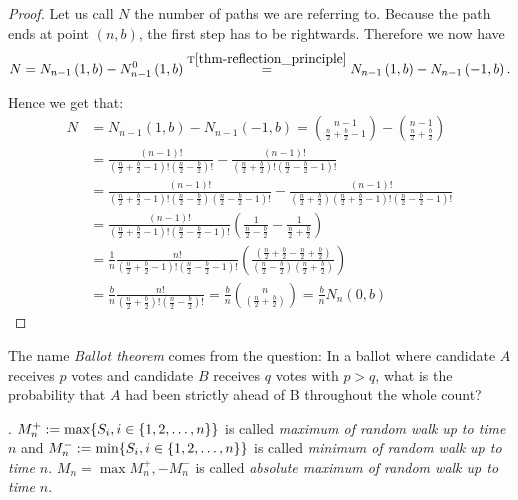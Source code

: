 \begin{proof}
 Let us call $N$ the number of paths we are referring to.
 Because the path ends at point $ \left( n,b \right) $, the first step has to be rightwards. Therefore we now have
 \[
    N=N_{n-1} \left( 1,b \right) -N_{n-1}^0 \left( 1,b \right) \overset{\text{T}\ref{thm-reflection_principle}}{=}N_{n-1} \left( 1,b \right) -N_{n-1} \left( -1,b \right).
\]


 Hence we get that:
 \[
 \begin{split}
 N & = N_{n-1} \left( 1,b \right) -N_{n-1} \left( -1,b \right)
 =\binom{n-1}{\frac{n}{2}+\frac{b}{2}-1}-\binom{n-1}{\frac{n}{2}+\frac{b}{2}}\\
 & =\frac{ \left( n-1 \right) !}{ \left( \frac{n}{2}+\frac{b}{2}-1 \right) ! \left( \frac{n}{2}-\frac{b}{2} \right) !}-\frac{ \left( n-1 \right) !}{ \left( \frac{n}{2}+\frac{b}{2} \right) ! \left( \frac{n}{2}-\frac{b}{2}-1 \right) !}\\
 & =\frac{ \left( n-1 \right) !}{ \left( \frac{n}{2}+\frac{b}{2}-1 \right) ! \left( \frac{n}{2}-\frac{b}{2} \right) \left( \frac{n}{2}-\frac{b}{2}-1 \right) !}-\frac{ \left( n-1 \right) !}{ \left( \frac{n}{2}+\frac{b}{2} \right) \left( \frac{n}{2}+\frac{b}{2}-1 \right) ! \left( \frac{n}{2}-\frac{b}{2}-1 \right) !}\\
 & =\frac{ \left( n-1 \right) !}{ \left( \frac{n}{2}+\frac{b}{2}-1 \right) ! \left( \frac{n}{2}-\frac{b}{2}-1 \right) !} \left( \frac{1}{\frac{n}{2}-\frac{b}{2}}-\frac{1}{\frac{n}{2}+\frac{b}{2}} \right) \\
 & =\frac{1}{n}\frac{n!}{ \left( \frac{n}{2}+\frac{b}{2}-1 \right) ! \left( \frac{n}{2}-\frac{b}{2}-1 \right) !} \left( \frac{ \left( \frac{n}{2}+\frac{b}{2}-\frac{n}{2}+\frac{b}{2} \right) }{ \left( \frac{n}{2}-\frac{b}{2} \right) \left( \frac{n}{2}+\frac{b}{2} \right)} \right)\\
 & =\frac{b}{n}\frac{n!}{ \left( \frac{n}{2}+\frac{b}{2} \right) ! \left( \frac{n}{2}-\frac{b}{2} \right) !}=\frac{b}{n}\binom{n}{ \left( \frac{n}{2}+\frac{b}{2} \right)}
 =\frac{b}{n}N_n \left( 0,b \right)
\end{split}
 \]
\end{proof}
 \begin{rem}
   The name \textit{Ballot theorem} comes from the question: In a ballot where candidate $A$ receives $p$ votes and candidate $B$ receives $q$ votes with $p > q$, what is the probability that $A$ had been strictly ahead of B throughout the whole count?
 \end{rem}
\begin{defn}\label{defn-max}
  \Lrw. $M_n^+:= \max \{S_i, i\in \{1,2,\ldots, n\}\}$ is called \emph{maximum of random walk \rw} \emph{up to time $n$} and $M_n^-:= \min \{S_i, i\in \{1,2,\ldots, n\}\}$ is called \emph{minimum of random walk \rw up to time $n.$} $M_n=\max{M_n^+, -M_n^-}$ is called \emph{absolute maximum of random walk \rw up to time $n.$}
\end{defn}
